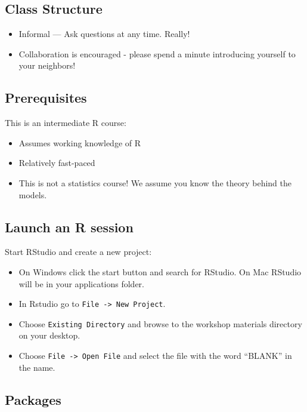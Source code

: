 \documentclass[]{book}
\providecommand{\tightlist}{%
  \setlength{\itemsep}{0pt}\setlength{\parskip}{0pt}}
\begin{document}
\subsection{Class Structure}\label{class-structure-1}

\begin{itemize}
\tightlist
\item
  Informal --- Ask questions at any time. Really!
\item
  Collaboration is encouraged - please spend a minute introducing
  yourself to your neighbors!
\end{itemize}

\subsection{Prerequisites}\label{prerequisites-1}

This is an intermediate R course:

\begin{itemize}
\tightlist
\item
  Assumes working knowledge of R
\item
  Relatively fast-paced
\item
  This is not a statistics course! We assume you know the theory behind
  the models.
\end{itemize}

\subsection{Launch an R session}\label{launch-an-r-session}

Start RStudio and create a new project:

\begin{itemize}
\tightlist
\item
  On Windows click the start button and search for RStudio. On Mac
  RStudio will be in your applications folder.
\item
  In Rstudio go to \texttt{File\ -\textgreater{}\ New\ Project}.
\item
  Choose \texttt{Existing\ Directory} and browse to the workshop
  materials directory on your desktop.
\item
  Choose \texttt{File\ -\textgreater{}\ Open\ File} and select the file
  with the word ``BLANK'' in the name.
\end{itemize}

\subsection{Packages}\label{packages}
\end{document}
